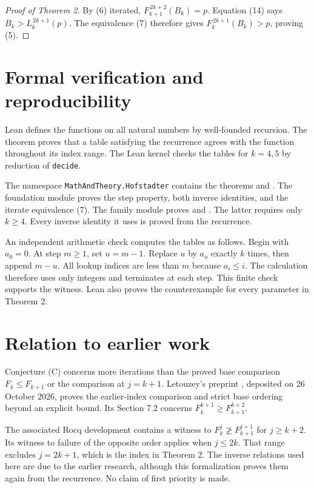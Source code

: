 \documentclass[11pt,a4paper]{article}
\newcommand{\itf}[2]{F_{#1}^{\,#2}}
\newcommand{\itl}[2]{L_{#1}^{\,#2}}
\begin{document}
\begin{proof}[Proof of Theorem 2]
By (6) iterated,
\(\itf{k+1}{2k+2}(B_k)=p\). Equation (14) says
\(B_k>\itl{k}{2k+1}(p)\). The equivalence (7) therefore gives
\(\itf{k}{2k+1}(B_k)>p\), proving (5).
\end{proof}


\section{Formal verification and reproducibility}\label{sec:formal}
Lean defines the functions on all natural numbers by well-founded recursion.
The theorem  proves that a table satisfying the
recurrence agrees with the function throughout its index range.
The Lean kernel checks the tables for $k=4,5$ by reduction of \texttt{decide}.

The namespace \texttt{MathAndTheory.Hofstadter} contains the theorems
 and .
The foundation module proves the step property, both inverse identities,
and the iterate equivalence (7). The family module proves
 and .
The latter requires only $k\geq4$. Every inverse identity it uses is proved
from the recurrence.

An independent arithmetic check computes the tables as follows.
Begin with $a_0=0$. At step $m\geq1$, set $u=m-1$.
Replace $u$ by $a_u$ exactly $k$ times, then append $m-u$.
All lookup indices are less than $m$ because $a_i\leq i$.
The calculation therefore uses only integers and terminates at each step.
This finite check supports the witness. Lean also proves the counterexample
for every parameter in Theorem 2.

\section{Relation to earlier work}
Conjecture (C) concerns more iterations than the proved base comparison
$F_k\leq F_{k+1}$ or the comparison at $j=k+1$.
Letouzey's preprint \cite{new}, deposited on 26 October 2026, proves the
earlier-index comparison and strict base ordering beyond an explicit bound.
Its Section 7.2 concerns $F_k^{k+1}\geq F_{k+1}^{k+2}$.

The associated Rocq development \cite{repo} contains a witness to
$F_k^j\not\geq F_{k+1}^{j+1}$ for $j\geq k+2$.
Its witness to failure of the opposite order applies when $j\leq2k$.
That range excludes $j=2k+1$, which is the index in Theorem 2.
The inverse relations used here are due to the earlier research,
although this formalization proves them again from the recurrence.
No claim of first priority is made.
\end{document}
